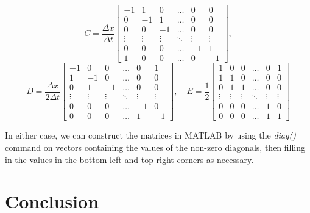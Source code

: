 \documentclass{myproject}
\begin{document}
\[
C = \frac{\Delta x}{\Delta t}
\begin{bmatrix}
-1 & 1 & 0 & \dots & 0 & 0 \\
0 & -1 & 1 & \dots & 0 & 0 \\
0 & 0 & -1 & \dots & 0 & 0 \\
\vdots & \vdots & \vdots & \ddots & \vdots & \vdots \\
0 & 0 & 0 & \dots & -1 & 1 \\
1 & 0 & 0 & \dots & 0 & -1
\end{bmatrix},
\]
\[
D = \frac{\Delta x}{2 \Delta t}
\begin{bmatrix}
-1 & 0 & 0 & \dots & 0 & 1 \\
1 & -1 & 0 & \dots & 0 & 0 \\
0 & 1 & -1 & \dots & 0 & 0 \\
\vdots & \vdots & \vdots & \ddots & \vdots & \vdots \\
0 & 0 & 0 & \dots & -1 & 0 \\
0 & 0 & 0 & \dots & 1 & -1
\end{bmatrix},
\quad
E = \frac{1}{2}
\begin{bmatrix}
1 & 0 & 0 & \dots & 0 & 1 \\
1 & 1 & 0 & \dots & 0 & 0 \\
0 & 1 & 1 & \dots & 0 & 0 \\
\vdots & \vdots & \vdots & \ddots & \vdots & \vdots \\
0 & 0 & 0 & \dots & 1 & 0 \\
0 & 0 & 0 & \dots & 1 & 1
\end{bmatrix}
\]

In either case, we can construct the matrices in MATLAB by using the \textit{diag()} command on vectors containing the values of the non-zero diagonals, then filling in the values in the bottom left and top right corners as necessary.

\section{Conclusion}

\nocite{iserles2009}
\nocite{trefethen2000}
\nocite{leveque1992}
\nocite{leveque2002}
\printbibliography
\end{document}
